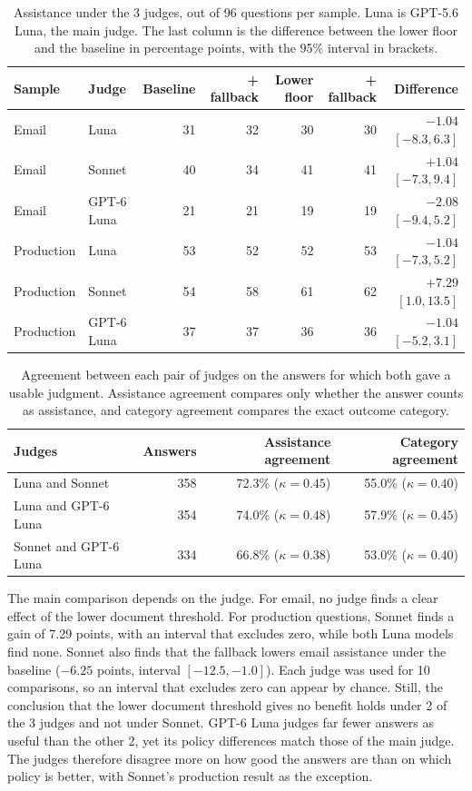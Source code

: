 \begin{table}[htbp]
\centering
\caption[Assistance under the 3 judges]{Assistance under the 3 judges, out of 96 questions per sample. Luna is GPT-5.6 Luna, the main judge. The last column is the difference between the lower floor and the baseline in percentage points, with the 95\% interval in brackets.}
\label{tab:sonnet-rejudge}
\small
\begin{tabular}{@{}llrrrrr@{}}
\toprule
Sample & Judge & Baseline & + fallback & Lower floor & + fallback & Difference \\
\midrule
Email & Luna & 31 & 32 & 30 & 30 & $-1.04$ $[-8.3, 6.3]$ \\
Email & Sonnet & 40 & 34 & 41 & 41 & $+1.04$ $[-7.3, 9.4]$ \\
Email & GPT-6 Luna & 21 & 21 & 19 & 19 & $-2.08$ $[-9.4, 5.2]$ \\
\addlinespace
Production & Luna & 53 & 52 & 52 & 53 & $-1.04$ $[-7.3, 5.2]$ \\
Production & Sonnet & 54 & 58 & 61 & 62 & $+7.29$ $[1.0, 13.5]$ \\
Production & GPT-6 Luna & 37 & 37 & 36 & 36 & $-1.04$ $[-5.2, 3.1]$ \\
\bottomrule
\end{tabular}
\end{table}

\begin{table}[htbp]
\centering
\caption[Agreement between the judges]{Agreement between each pair of judges on the answers for which both gave a usable judgment. Assistance agreement compares only whether the answer counts as assistance, and category agreement compares the exact outcome category.}
\label{tab:judge-pairs}
\small
\begin{tabular}{@{}lrrr@{}}
\toprule
Judges & Answers & Assistance agreement & Category agreement \\
\midrule
Luna and Sonnet & 358 & 72.3\% ($\kappa=0.45$) & 55.0\% ($\kappa=0.40$) \\
Luna and GPT-6 Luna & 354 & 74.0\% ($\kappa=0.48$) & 57.9\% ($\kappa=0.45$) \\
Sonnet and GPT-6 Luna & 334 & 66.8\% ($\kappa=0.38$) & 53.0\% ($\kappa=0.40$) \\
\bottomrule
\end{tabular}
\end{table}

The main comparison depends on the judge. For email, no judge finds a clear effect of the lower document threshold. For production questions, Sonnet finds a gain of 7.29 points, with an interval that excludes zero, while both Luna models find none. Sonnet also finds that the fallback lowers email assistance under the baseline ($-6.25$ points, interval $[-12.5,-1.0]$). Each judge was used for 10 comparisons, so an interval that excludes zero can appear by chance. Still, the conclusion that the lower document threshold gives no benefit holds under 2 of the 3 judges and not under Sonnet. GPT-6 Luna judges far fewer answers as useful than the other 2, yet its policy differences match those of the main judge. The judges therefore disagree more on how good the answers are than on which policy is better, with Sonnet's production result as the exception.

